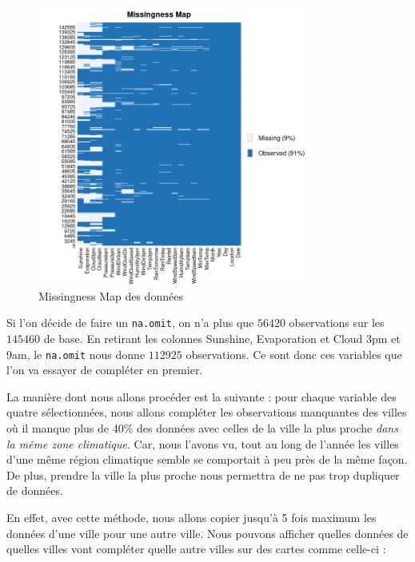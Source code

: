 \documentclass{article}
\begin{document}
\begin{figure}[H]
    \centering
    \includegraphics[width=0.8\textwidth]{Ressources/missmap.png}
    \caption{Missingness Map des données}
\end{figure}

Si l'on décide de faire un \texttt{na.omit}, on n'a plus que $56420$ observations sur les $145460$ de base. En retirant les colonnes Sunshine, Evaporation et Cloud 3pm et 9am, le \texttt{na.omit} nous donne $112925$ observations. Ce sont donc ces variables que l'on va essayer de compléter en premier.

La manière dont nous allons procéder est la suivante : pour chaque variable des quatre sélectionnées, nous allons compléter les observations manquantes des villes où il manque plus de 40\% des données avec celles de la ville la plus proche \emph{dans la même zone climatique}. Car, nous l'avons vu, tout au long de l'année les villes d'une même région climatique semble se comportait à peu près de la même façon. De plus, prendre la ville la plus proche nous permettra de ne pas trop dupliquer de données. 

En effet, avec cette méthode, nous allons copier jusqu'à 5 fois maximum les données d'une ville pour une autre ville. Nous pouvons afficher quelles données de quelles villes vont compléter quelle autre villes sur des cartes comme celle-ci :
\end{document}
